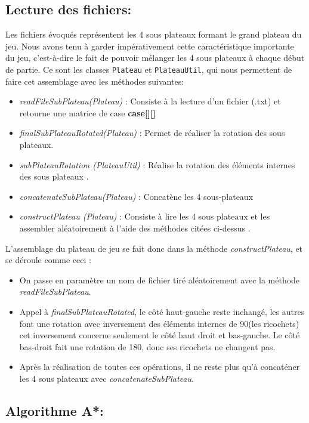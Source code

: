 \documentclass[12pt, a4paper, openany]{article}
\newcommand{\classname}[1]{\texttt{#1}}
\newcommand{\methodename}[1]{\textit{#1}}
\begin{document}
\subsection{Lecture des fichiers:}
Les fichiers évoqués représentent les 4 sous plateaux formant le grand plateau du jeu. Nous avons tenu à garder impérativement cette caractéristique importante du jeu, c'est-à-dire le fait de pouvoir mélanger les 4 sous plateaux à chaque début de partie. Ce sont les classes \classname{Plateau} et \classname{PlateauUtil}, qui nous permettent de faire cet assemblage avec les méthodes suivantes:
\begin{itemize}
\item \methodename{readFileSubPlateau(Plateau)} : Consiste à la lecture d'un fichier (.txt) et retourne une matrice de case \textbf{case[][]}
\item \methodename{finalSubPlateauRotated(Plateau)} : Permet de réaliser la rotation des sous plateaux.
\item \methodename{subPlateauRotation (PlateauUtil)} : Réalise la rotation des éléments internes des sous plateaux .
\item \methodename{concatenateSubPlateau(Plateau)} : Concatène les 4 sous-plateaux 
\item \methodename{constructPlateau (Plateau)} : Consiste à lire les 4 sous plateaux et les assembler aléatoirement à l'aide des méthodes citées ci-dessus .
\end{itemize}
L'assemblage du plateau de jeu se fait donc dans la méthode \methodename{constructPlateau}, et se déroule comme ceci :
\begin{itemize}
\item On passe en paramètre un nom de fichier tiré aléatoirement avec la méthode \methodename{readFileSubPlateau}.
\item Appel à \methodename{finalSubPlateauRotated}, le côté haut-gauche reste inchangé, les autres font une rotation avec inversement des éléments internes de 90\degree (les ricochets) cet inversement concerne seulement le côté haut droit et bas-gauche. Le côté bas-droit fait une rotation de 180\degree , donc ses ricochets ne changent pas.
\item Après la réalisation de toutes ces opérations, il ne reste plus qu'à concaténer les 4 sous plateaux avec \methodename{concatenateSubPlateau}.
\end{itemize}

\subsection{Algorithme A*:}
\end{document}
